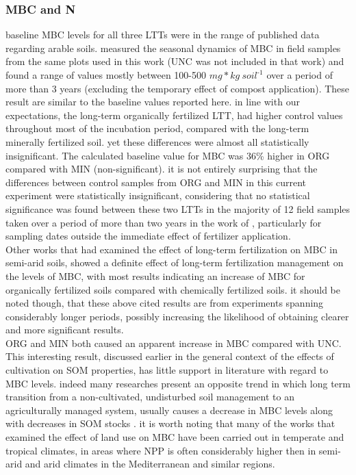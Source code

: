 \documentclass[12pt]{report}
\newcommand{\myGreen}[1]{\textcolor{olive}{#1}} %
\newlength{\SpaceAfterUnit}
\newcommand{\genericunit}{$ mg * kg\ soil^{\text{-}1}$ \hspace*{\SpaceAfterUnit}}
\begin{document}
\subsubsection{MBC and N}

baseline MBC levels for all three LTTs were in the range of published data regarding arable soils\citep{gonzalez-quinones2011}. \citet{rotbart2018} measured the seasonal dynamics of MBC in field samples from the same plots used in this work (UNC was not included in that work) and found a range of values mostly between 100-500 \genericunit over a period of more than 3 years (excluding the temporary effect of compost application). These result are similar to the baseline values reported here.
in line with our expectations, the long-term organically fertilized LTT, had higher control values throughout most of the incubation period, compared with the long-term minerally fertilized soil. yet these differences were almost all statistically insignificant. The calculated baseline value for MBC was 36\% higher in ORG compared with MIN (non-significant). it is not entirely surprising that the differences between control samples from ORG and MIN in this current experiment were statistically insignificant, considering that no statistical significance was found between these  two LTTs in the majority of 12 field samples taken over a period of more than two years in the work of \citet{rotbart2018}, particularly for sampling dates outside the immediate effect of fertilizer application.\\
Other works that had examined the effect of long-term fertilization on MBC in semi-arid soils, showed a definite effect of long-term fertilization management on the levels of MBC, with most results indicating an increase of MBC for organically fertilized soils compared with chemically fertilized soils\citep{luo2015, liu2013, ghoshal1995}. it should be noted though, that these above cited results are from experiments spanning considerably longer periods, possibly increasing the likelihood of obtaining clearer and more significant results.\\
ORG and MIN both caused an apparent increase in MBC compared with UNC. This interesting result, discussed earlier in the general context of the effects of cultivation on SOM properties, has little support in literature with regard to MBC levels. indeed many researches present an opposite trend in which long term transition from a non-cultivated, undisturbed soil management to an agriculturally managed system, usually causes a decrease in MBC levels along with decreases in SOM stocks \citep{benbi2015, yu2013,zhou2018}. it is worth noting that many of the works that examined the effect of land use on MBC have been carried out in temperate and tropical climates, in areas where NPP is often considerably higher then in semi-arid and arid climates in the Mediterranean and similar regions.\\
\end{document}
